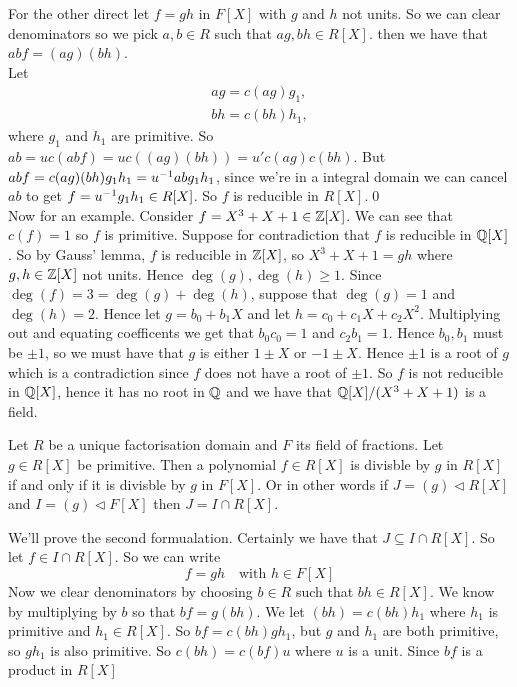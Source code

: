 \documentclass{article}
\newcommand{\nrm}{\triangleleft}
\begin{document}
\begin{itemize}
For the other direct let $ f=gh $ in $ F[X] $ with $ g $ and $ h $ not units. So we can clear denominators so we pick $ a,b\in R $ such that $ ag,bh\in R[X] $. then we have that $ abf=(ag)(bh) $.\\
Let
\begin{gather*}
  ag=c(ag)g_1,\\
  bh=c(bh)h_1,
\end{gather*}
where $ g_1 $ and $ h_1 $ are primitive. So $ ab=uc(abf)=uc((ag)(bh))=u'c(ag)c(bh) $. But $ abf=c(ag)(bh)g_1h_1={u}^{-1} abg_1h_1 $, since we're in a integral domain we can cancel $ ab $ to get $ f={u}^{-1} g_1h_1\in R[X] $. So $ f $ is reducible in $ R[X] $.\qed\\

Now for an example. Consider $ f=X^3+X+1\in \mathbb{Z}[X] $. We can see that $ c(f) =1 $ so $ f $ is primitive. Suppose for contradiction that $ f $ is reducible in $ \mathbb{Q}[X] $. So by Gauss' lemma, $ f $ is reducible in $ \mathbb{Z}[X] $, so $ X^3+X+1=gh $ where $ g,h\in \mathbb{Z}[X] $ not units. Hence $ \deg(g),\deg(h)\ge 1 $. Since $ \deg(f)=3=\deg(g)+\deg(h) $, suppose that $ \deg(g)=1 $ and $ \deg(h)=2 $. Hence let $ g=b_0+b_1X $ and let $ h=c_0+c_1X+c_2X^2 $. Multiplying out and equating coefficents we get that $ b_0c_0=1 $ and $ c_2b_1=1 $. Hence $ b_0,b_1 $ must be $ \pm 1 $, so we must have that $ g $ is either $ 1\pm X $ or $ -1\pm X $. Hence $ \pm 1 $ is a root of $ g $ which is a contradiction since $ f $ does not have a root of $ \pm 1 $. So $ f $ is not reducible in $ \mathbb{Q}[X] $, hence it has no root in $ \mathbb{Q} $ and we have that $ \mathbb{Q}[X]/(X^3+X+1) $ is a field.
\begin{proposition}
	Let $ R $ be a unique factorisation domain and $ F $ its field of fractions. Let $ g\in R[X] $ be primitive. Then a polynomial $ f\in R[X] $ is divisble by $ g $ in $ R[X] $ if and only if it is divisble by $ g $ in $ F[X] $. Or in other words if $ J=(g)\nrm R[X] $ and $ I=(g)\nrm F[X] $ then $ J=I\cap R[X] $.
\end{proposition}
\pf We'll prove the second formualation. Certainly we have that $ J\subseteq I\cap R[X] $. So let $ f\in I\cap R[X] $. So we can write
\[
	f=gh \quad\text{with }h\in F[X] 
\]
Now we clear denominators by choosing $ b \in R $ such that $ bh\in R[X] $. We know by multiplying by $ b $ so that $ bf=g(bh) $. We let $ (bh)=c(bh)h_1 $ where $ h_1 $ is primitive and $ h_1\in R[X] $. So $ bf = c(bh)gh_1 $, but $ g $ and $ h_1 $ are both primitive, so $ gh_1 $ is also primitive. So $ c(bh) = c(bf)u $ where $ u $ is a unit. Since $ bf $ is a product in $ R[X] $

\end{itemize}
\end{document}
